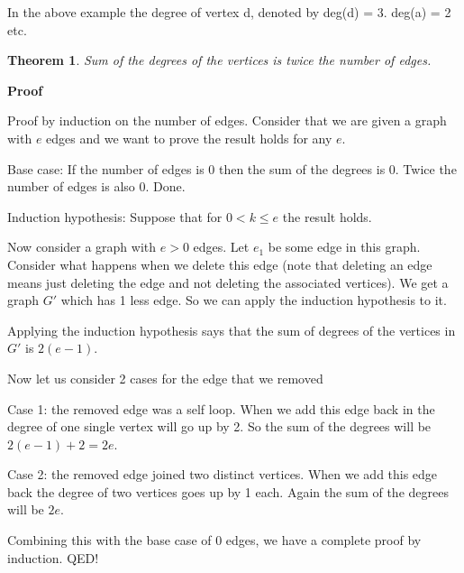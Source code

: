 \documentclass[12pt]{article}
\newtheorem{theorem}{Theorem}
\begin{document}
In the above example the degree of vertex d, denoted by deg(d) = 3. deg(a) = 2 etc.

\begin{theorem}
Sum of the degrees of the vertices is twice the number of edges.
\end{theorem}

\textbf{Proof}

Proof by induction on the number of edges. Consider that we are given a graph with $e$ edges and we want to prove the result holds for any $e$.

Base case: If the number of edges is 0 then the sum of the degrees is 0. Twice the number of edges is also 0. Done.

Induction hypothesis: Suppose that for $0 < k \le e$  the result holds.

Now consider a graph with $e > 0$ edges. Let $e_1$ be some edge in this graph. Consider what happens when we delete this edge (note that deleting an edge means just deleting the edge and not deleting the associated vertices). We get a graph $G'$ which has 1 less edge. So we can apply the induction hypothesis to it.

Applying the induction hypothesis says that the sum of degrees of the vertices in $G'$ is $2(e-1)$.

Now let us consider 2 cases for the edge that we removed

Case 1: the removed edge was a self loop. When we add this edge back in the degree of one single vertex will go up by 2. So the sum of the degrees will be $2(e-1) + 2 = 2e$.

Case 2: the removed edge joined two distinct vertices. When we add this edge back the degree of two vertices goes up by 1 each. Again the sum of the degrees will be $2e$.


Combining this with the base case of 0 edges, we have a complete proof by induction. QED!
\end{document}
